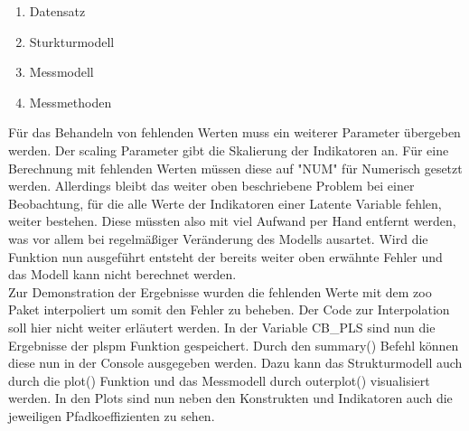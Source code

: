 \documentclass{article}\usepackage[]{graphicx}\usepackage[]{color}
\begin{document}
\begin{enumerate}
    \item Datensatz
    \item Sturkturmodell
    \item Messmodell
    \item Messmethoden
\end{enumerate}
Für das Behandeln von fehlenden Werten muss ein weiterer Parameter übergeben werden. Der scaling Parameter gibt die Skalierung der Indikatoren an. Für eine Berechnung mit fehlenden Werten müssen diese auf "NUM" für Numerisch gesetzt werden. Allerdings bleibt das weiter oben beschriebene Problem bei einer Beobachtung, für die alle Werte der Indikatoren einer Latente Variable fehlen, weiter bestehen. Diese müssten also mit viel Aufwand per Hand entfernt werden, was vor allem bei regelmäßiger Veränderung des Modells ausartet. Wird die Funktion nun ausgeführt entsteht der bereits weiter oben erwähnte Fehler und das Modell kann nicht berechnet werden.\\
Zur Demonstration der Ergebnisse wurden die fehlenden Werte mit dem zoo Paket interpoliert um somit den Fehler zu beheben. Der Code zur Interpolation soll hier nicht weiter erläutert werden. In der Variable CB\_PLS sind nun die Ergebnisse der plspm Funktion gespeichert. Durch den summary() Befehl können diese nun in der Console ausgegeben werden. Dazu kann das Strukturmodell auch durch die plot() Funktion und das Messmodell durch outerplot() visualisiert werden. In den Plots sind nun neben den Konstrukten und Indikatoren auch die jeweiligen Pfadkoeffizienten zu sehen.
\end{document}
